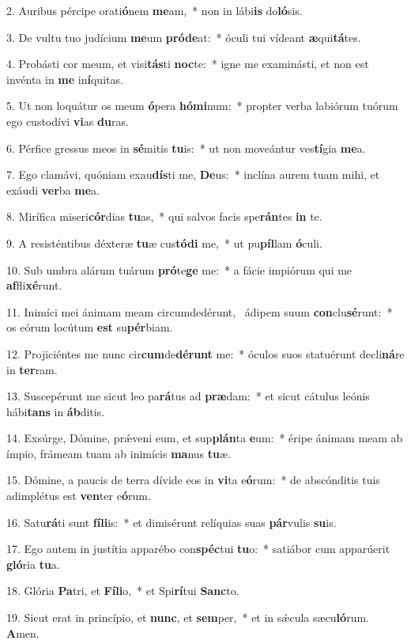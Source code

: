 2. Auribus pércipe orati\textbf{ó}nem \textbf{me}am,~*  non in lábi\textbf{is} do\textbf{ló}sis.\

3. De vultu tuo judícium \textbf{me}um \textbf{pród}\textbf{e}at:~*  óculi tui vídeant \textbf{æ}qui\textbf{tá}tes.\

4. Probásti cor meum, et visi\textbf{tás}ti \textbf{noc}te:~*  igne me examinásti, et non est invénta in \textbf{me} in\textbf{í}quitas.\

5. Ut non loquátur os meum \textbf{ó}pera \textbf{hó}\textbf{mi}num:~*  propter verba labiórum tuórum ego custodívi \textbf{vi}as \textbf{du}ras.\

6. Pérfice gressus meos in \textbf{sé}mitis \textbf{tu}is:~*  ut non moveántur ves\textbf{tí}gia \textbf{me}a.\

7. Ego clamávi, quóniam exau\textbf{dís}ti me, \textbf{De}us:~*  inclína aurem tuam mihi, et exáudi \textbf{ver}ba \textbf{me}a.\

8. Mirífica miseri\textbf{cór}dias \textbf{tu}as,~*  qui salvos facis spe\textbf{rán}tes \textbf{in} te.\

9. A resisténtibus déxteræ \textbf{tu}æ cus\textbf{tó}\textbf{di} me,~*  ut pu\textbf{píl}lam \textbf{ó}culi.\

10. Sub umbra alárum tuárum \textbf{pró}te\textbf{ge} me:~*  a fácie impiórum qui me \textbf{af}fli\textbf{xé}runt.\

11. Inimíci mei ánimam meam circumdedérunt, \dag\  ádipem suum \textbf{con}clu\textbf{sé}runt:~*  os eórum locútum \textbf{est} su\textbf{pér}biam.\

12. Projiciéntes me nunc cir\textbf{cum}de\textbf{dé}\textbf{runt} me:~*  óculos suos statuérunt decli\textbf{ná}re in \textbf{ter}ram.\

13. Suscepérunt me sicut leo pa\textbf{rá}tus ad \textbf{præ}dam:~*  et sicut cátulus leónis hábi\textbf{tans} in \textbf{áb}ditis.\

14. Exsúrge, Dómine, prǽveni eum, et sup\textbf{plán}ta \textbf{e}um:~*  éripe ánimam meam ab ímpio, frámeam tuam ab inimícis \textbf{ma}nus \textbf{tu}æ.\

15. Dómine, a paucis de terra dívide eos in \textbf{vi}ta e\textbf{ó}rum:~*  de abscónditis tuis adimplétus est \textbf{ven}ter e\textbf{ó}rum.\

16. Satu\textbf{rá}ti sunt \textbf{fí}\textbf{li}is:~*  et dimisérunt relíquias suas \textbf{pár}vulis \textbf{su}is.\

17. Ego autem in justítia apparébo con\textbf{spéc}tui \textbf{tu}o:~*  satiábor cum apparúerit \textbf{gló}ria \textbf{tu}a.\

18. Glória \textbf{Pa}tri, et \textbf{Fí}\textbf{li}o,~*  et Spi\textbf{rí}tui \textbf{Sanc}to.\

19. Sicut erat in princípio, et \textbf{nunc}, et \textbf{sem}per,~*  et in sǽcula sæcu\textbf{ló}rum. \textbf{A}men.\

